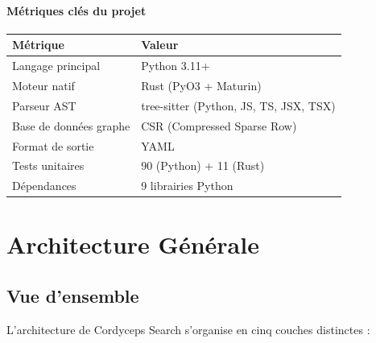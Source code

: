 \documentclass[12pt,a4paper]{article}
\begin{document}
\paragraph{Métriques clés du projet}
\begin{center}
\begin{tabular}{ll}
    \toprule
    \textbf{Métrique} & \textbf{Valeur} \\
    \midrule
    Langage principal & Python 3.11+ \\
    Moteur natif & Rust (PyO3 + Maturin) \\
    Parseur AST & tree-sitter (Python, JS, TS, JSX, TSX) \\
    Base de données graphe & CSR (Compressed Sparse Row) \\
    Format de sortie & YAML \\
    Tests unitaires & 90 (Python) + 11 (Rust) \\
    Dépendances & 9 librairies Python \\
    \bottomrule
\end{tabular}
\end{center}

\section{Architecture Générale}

\subsection{Vue d'ensemble}

L'architecture de Cordyceps Search s'organise en cinq couches distinctes :
\end{document}
